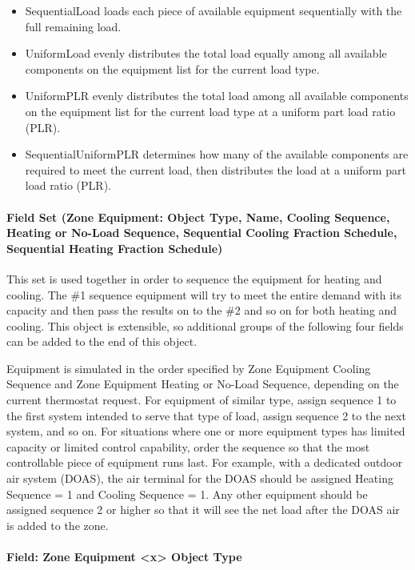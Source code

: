 \begin{itemize}
\item
  SequentialLoad loads each piece of available equipment sequentially with the full remaining load.
\item
  UniformLoad evenly distributes the total load equally among all available components on the equipment list for the current load type.
\item
  UniformPLR evenly distributes the total load among all available components on the equipment list for the current load type at a uniform part load ratio (PLR).
\item
  SequentialUniformPLR determines how many of the available components are required to meet the current load, then distributes the load at a uniform part load ratio (PLR).
\end{itemize}
\paragraph{Field Set (Zone Equipment: Object Type, Name, Cooling Sequence, Heating or No-Load Sequence, Sequential Cooling Fraction Schedule, Sequential Heating Fraction Schedule)}\label{field-set-zone-equipment-object-type-name-cooling-sequence-heating-or-no-load-sequence}

This set is used together in order to sequence the equipment for heating and cooling. The \#1 sequence equipment will try to meet the entire demand with its capacity and then pass the results on to the \#2 and so on for both heating and cooling. This object is extensible, so additional groups of the following four fields can be added to the end of this object.

Equipment is simulated in the order specified by Zone Equipment Cooling Sequence and Zone Equipment Heating or No-Load Sequence, depending on the current thermostat request. For equipment of similar type, assign sequence 1 to the first system intended to serve that type of load, assign sequence 2 to the next system, and so on. For situations where one or more equipment types has limited capacity or limited control capability, order the sequence so that the most controllable piece of equipment runs last. For example, with a dedicated outdoor air system (DOAS), the air terminal for the DOAS should be assigned Heating Sequence = 1 and Cooling Sequence = 1. Any other equipment should be assigned sequence 2 or higher so that it will see the net load after the DOAS air is added to the zone.

\paragraph{Field: Zone Equipment \textless{}x\textgreater{} Object Type}\label{field-zone-equipment-x-object-type}

